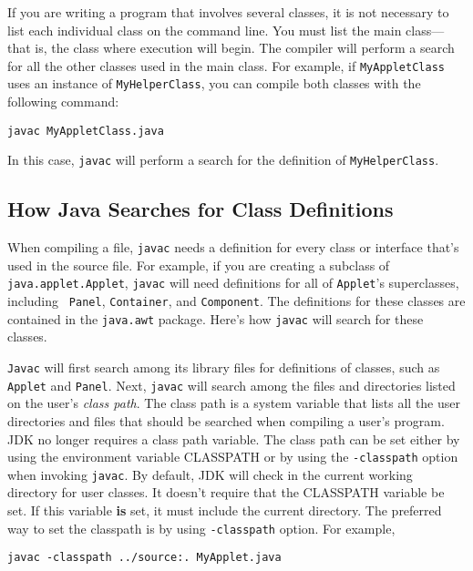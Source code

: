 If you are writing a program that involves several classes, it is not
necessary to list each individual class on the command line.  You must
list the main class---that is, the class where execution will begin.
The compiler will perform a search for all the other classes used in
the main class.  For example, if {\tt MyAppletClass} uses an instance
of {\tt MyHelperClass}, you can compile both classes with the following
command:

\begin{jjjlisting}
\begin{lstlisting}
javac MyAppletClass.java
\end{lstlisting}
\end{jjjlisting}

\noindent In this case, {\tt javac} will perform a search for
the definition of {\tt MyHelperClass}.

\subsection*{How Java Searches for Class Definitions}
\noindent When compiling a file, {\tt javac} needs a definition for every class
or interface that's used in the source file.  For example, if you are
creating a subclass of {\tt java.applet.Applet}, {\tt javac} will need
definitions for all of {\tt Applet}'s superclasses, including {\tt
Panel}, {\tt Container}, and {\tt Component}. The definitions for
these classes are contained in the {\tt java.awt} package.   Here's how
{\tt javac} will search for these classes.


{\tt Javac} will first search among its library files for 
definitions of classes, such as {\tt Applet}
and {\tt Panel}.  Next, {\tt javac} will search among the files and
directories listed on the user's {\it class path}. The class path is a
system variable that lists all the user directories and files that
should be searched when compiling a user's program.  
JDK no longer requires a class path variable. The class path can
be set either by using the environment variable CLASSPATH or by using
the {\tt -classpath} option when invoking {\tt javac}. 
By default, JDK will check in the current working directory
for user classes. It doesn't require that the CLASSPATH variable be set. If this variable
{\bf is} set, it must include the current directory.
The preferred way to set the classpath is by using {\tt -classpath} option.
For example,

\begin{jjjlisting}
\begin{lstlisting}
javac -classpath ../source:. MyApplet.java
\end{lstlisting}
\end{jjjlisting}

